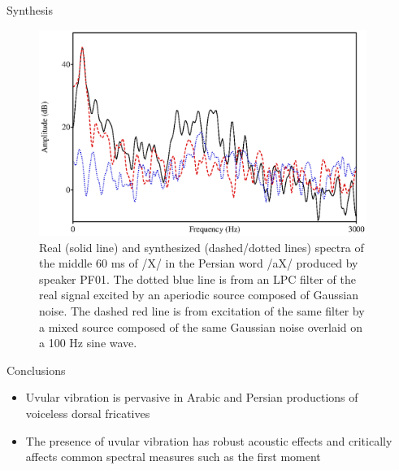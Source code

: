 \documentclass[final]{beamer}
\newlength{\sepwid}
\newlength{\onecolwid}
\begin{document}
\begin{frame}[t]
\begin{columns}[t]
\begin{column}{\sepwid}\end{column} %

\begin{column}{\onecolwid} %


\begin{block}{Synthesis}

  \begin{figure}
    \includegraphics[width=\linewidth]{plots/synthPlot.eps}
    \caption{Real (solid line) and synthesized (dashed/dotted lines) spectra of the middle 60 ms of /X/ in the Persian word /aX/ produced by speaker PF01. The dotted blue line is from an LPC filter of the real signal excited by an aperiodic source composed of Gaussian noise. The dashed red line is from excitation of the same filter by a mixed source composed of the same Gaussian noise overlaid on a 100 Hz sine wave.}
  \end{figure}

\end{block}


\begin{block}{Conclusions}

  \begin{itemize}
    \item Uvular vibration is pervasive in Arabic and Persian productions of voiceless dorsal fricatives
    \item The presence of uvular vibration has robust acoustic effects and critically affects common spectral measures such as the first moment


\end{itemize}
\end{block}
\end{column}
\end{columns}
\end{frame}
\end{document}
